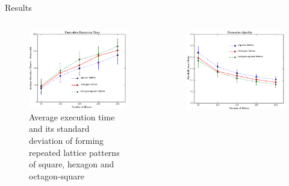 \documentclass[10pt]{beamer}
\begin{document}
\begin{frame}{Results}{}
   \begin{columns}[T] %
      \begin{column}{.48\textwidth}
        \begin{figure}
          \centering
          \includegraphics[width=\textwidth]{figs/exptime}
          \caption{Average execution time and its standard deviation
            of forming repeated lattice patterns of square, hexagon
            and octagon-square}
        \end{figure}
      \end{column}%
      \begin{column}{.48\textwidth}
        \begin{figure}
          \centering
          \includegraphics[width=\textwidth]{figs/expqual}

\end{figure}
\end{column}
\end{columns}
\end{frame}
\end{document}
